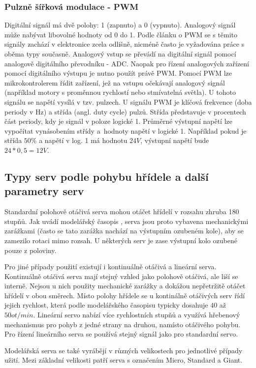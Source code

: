 \subsubsection*{Pulzně šířková modulace - PWM}
Digitální signál má dvě polohy: 1 (zapnuto) a 0 (vypnuto). Analogový signál může nabývat libovolné hodnoty od 0 do 1. Podle článku o PWM \cite{servoAnalogIcTips} se s těmito signály zachází v elektronice zcela odlišně, nicméně často je vyžadována práce s oběma typy současně. Analogový vstup se převádí na digitální signál pomocí analogově digitálního převodníku - ADC. Naopak pro řízení analogových zařízení pomocí digitálního výstupu je nutno použít právě PWM. Pomocí PWM lze mikrokontrolerem řídit zařízení, jež na vstupu očekávají analogový signál (například motory s proměnnou rychlostí nebo stmívatelná světla). U tohoto signálu se napětí vysílá v tzv. pulzech. U signálu PWM je klíčová frekvence (doba periody v Hz) a střída (angl. duty cycle) pulzů. Střída představuje v procentech část periody, kdy je signál v poloze logické 1. Průměrné výstupní napětí lze vypočítat vynásobením střídy a~hodnoty napětí v logické 1. Například pokud je střída $50\%$ a napětí v log. 1 má hodnotu $24V$, výstupní napětí bude $24*0,5= 12V$.

\subsection*{Typy serv podle pohybu hřídele a další parametry serv}
Standardní polohově otáčivá serva mohou otáčet hřídelí v rozsahu zhruba 180 stupňů. Jak uvádí modelářský časopis \cite{ServoMagazine}, serva jsou proto vybavena mechanickými zarážkami (často se tato zarážka nachází na výstupním ozubeném kole), aby se zamezilo rotaci mimo rozsah. U některých serv je zase výstupní kolo ozubené pouze z poloviny. 

Pro jiné případy použití existují i kontinuálně otáčivá a lineární serva. Kontinuálně otáčivá serva mají stejný vzhled jako polohově otáčivá, ale liší se interně. Nejsou u nich použity mechanické zarážky a dokážou nepřetržitě otáčet hřídelí v obou směrech. Místo polohy hřídele se u kontinálně otáčivých serv řídí jejich rychlost, která podle modelářského časopisu \cite{ServoMagazine} typicky dosahuje $40$ až $50ot/min$. Lineární servo nabízí více rychlostních stupňů a využívá hřebenový mechanismus pro pohyb z jedné strany na druhou, namísto otáčivého pohybu. Pro řízení lineárního serva se používá stejný signál jako pro standardní servo.

Modelářská serva se také vyrábějí v různých velikostech pro jednotlivé případy užití. Mezi základní velikosti patří serva s označením Micro, Standard a Giant.

